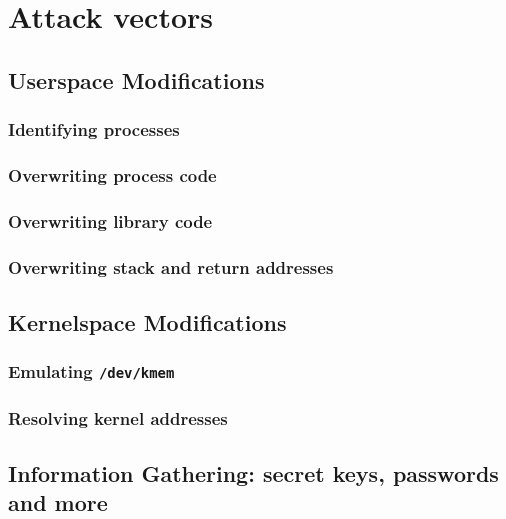 %
%

\section{Attack vectors}



\subsection{Userspace Modifications}

\subsubsection{Identifying processes}

\subsubsection{Overwriting process code}

\subsubsection{Overwriting library code}

\subsubsection{Overwriting stack and return addresses}



\subsection{Kernelspace Modifications}

\subsubsection{Emulating \texttt{/dev/kmem}}

\subsubsection{Resolving kernel addresses}



\subsection{Information Gathering: secret keys, passwords and more}

